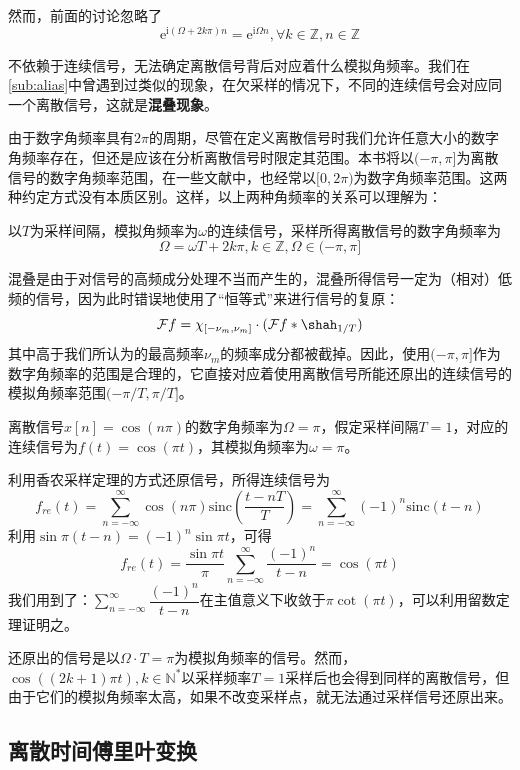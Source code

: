 然而，前面的讨论忽略了
$$\mathrm{e}^{\mathrm{i}(\Omega+2k\pi)n}=\mathrm{e}^{\mathrm{i}\Omega n},\forall k\in\mathbb{Z},n\in\mathbb{Z}$$

不依赖于连续信号，无法确定离散信号背后对应着什么模拟角频率。我们在\ref{sub:alias}中曾遇到过类似的现象，在欠采样的情况下，不同的连续信号会对应同一个离散信号，这就是\textbf{混叠现象}。

由于数字角频率具有$2\pi$的周期，尽管在定义离散信号时我们允许任意大小的数字角频率存在，但还是应该在分析离散信号时限定其范围。本书将以$(-\pi,\pi]$为离散信号的数字角频率范围\cite{signal_systems}，在一些文献中，也经常以$[0,2\pi)$为数字角频率范围。这两种约定方式没有本质区别。这样，以上两种角频率的关系可以理解为：

\begin{proposition}
以$T$为采样间隔，模拟角频率为$\omega$的连续信号，采样所得离散信号的数字角频率为
\[\Omega=\omega T+2k\pi,k\in\mathbb{Z},\Omega\in(-\pi,\pi]\]
\end{proposition}

混叠是由于对信号的高频成分处理不当而产生的，混叠所得信号一定为（相对）低频的信号，因为此时错误地使用了“恒等式”来进行信号的复原：
\[\mathcal{F} f=\chi_{[-\nu_m,\nu_m]}\cdot (\mathcal{F} f*\shah_{1/T})\]
其中高于我们所认为的最高频率$\nu_m$的频率成分都被截掉。因此，使用$(-\pi,\pi]$作为数字角频率的范围是合理的，它直接对应着使用离散信号所能还原出的连续信号的模拟角频率范围$(-\pi/T,\pi/T]$。

\begin{example}
    离散信号$x[n]=\cos(n\pi)$的数字角频率为$\Omega=\pi$，假定采样间隔$T=1$，对应的连续信号为$f(t)=\cos(\pi t)$，其模拟角频率为$\omega=\pi$。

    利用香农采样定理的方式还原信号，所得连续信号为
    \[f_{re}(t)=\sum_{n=-\infty}^{\infty}\cos(n\pi)\mathrm{sinc}\left(\frac{t-nT}{T}\right)=\sum_{n=-\infty}^{\infty}(-1)^n\mathrm{sinc}\left(t-n\right)\]
    利用$\sin\pi(t-n)=(-1)^n\sin\pi t$，可得
    \[f_{re}(t)=\frac{\sin\pi t}{\pi}\sum_{n=-\infty}^{\infty}\frac{(-1)^n}{t-n}=\cos(\pi t)\]
    我们用到了：$\sum_{n=-\infty}^{\infty}\dfrac{(-1)^n}{t-n}$在主值意义下收敛于$\pi\cot(\pi t)$，可以利用留数定理证明之。

    还原出的信号是以$\Omega\cdot T=\pi$为模拟角频率的信号。然而，$\cos((2k+1)\pi t),k\in\mathbb{N}^*$以采样频率$T=1$采样后也会得到同样的离散信号，但由于它们的模拟角频率太高，如果不改变采样点，就无法通过采样信号还原出来。
\end{example}

\subsection{离散时间傅里叶变换}\label{sub:dtft}

